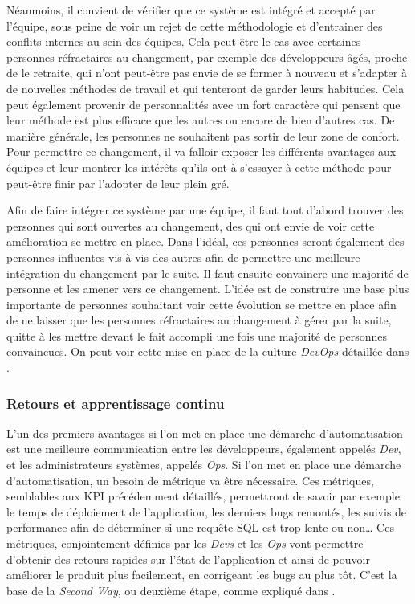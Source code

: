 
Néanmoins, il convient de vérifier que ce système est intégré et accepté par l'équipe, sous peine de voir un rejet de cette méthodologie \devops{} et d'entrainer des conflits internes au sein des équipes. Cela peut être le cas avec certaines personnes réfractaires au changement, par exemple des développeurs âgés, proche de le retraite, qui n'ont peut-être pas envie de se former à nouveau et s'adapter à de nouvelles méthodes de travail et qui tenteront de garder leurs habitudes. Cela peut également provenir de personnalités avec un fort caractère qui pensent que leur méthode est plus efficace que les autres ou encore de bien d'autres cas. De manière générale, les personnes ne souhaitent pas sortir de leur zone de confort. Pour permettre ce changement, il va falloir exposer les différents avantages aux équipes et leur montrer les intérêts qu'ils ont à s'essayer à cette méthode pour peut-être finir par l'adopter de leur plein gré. 

Afin de faire intégrer ce système par une équipe, il faut tout d'abord trouver des personnes qui sont ouvertes au changement, des  qui ont envie de voir cette amélioration se mettre en place. Dans l'idéal, ces personnes seront également des personnes influentes vis-à-vis des autres afin de permettre une meilleure intégration du changement par le suite. Il faut ensuite convaincre une majorité de personne et les amener vers ce changement. L'idée est de construire une base plus importante de personnes souhaitant voir cette évolution se mettre en place afin de ne laisser que les personnes réfractaires au changement à gérer par la suite, quitte à les mettre devant le fait accompli une fois une majorité de personnes convaincues. On peut voir cette mise en place de la culture \emph{DevOps} détaillée dans  \cite[p.58-59]{devOpsHandbook}.

\subsubsection{Retours et apprentissage continu}

L'un des premiers avantages si l'on met en place une démarche d'automatisation est une meilleure communication entre les développeurs, également appelés \emph{Dev}, et les administrateurs systèmes, appelés \emph{Ops}. Si l'on met en place une démarche d'automatisation, un besoin de métrique va être nécessaire. Ces métriques, semblables aux \gls{KPI} précédemment détaillés, permettront de savoir par exemple le temps de déploiement de l'application, les derniers bugs remontés, les suivis de performance afin de déterminer si une requête \gls{SQL} est trop lente ou non\ldots{} Ces métriques, conjointement définies par les \emph{Devs} et les \emph{Ops} vont permettre d'obtenir des retours rapides sur l'état de l'application et ainsi de pouvoir améliorer le produit plus facilement, en corrigeant les bugs au plus tôt. C'est la base de la \emph{Second Way}, ou deuxième étape, comme expliqué dans  \cite[p.405-410]{phoenixProject}.


